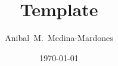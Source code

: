 \documentclass{amsart}
\title[Short title]{Template}
\author{Anibal~M.~Medina-Mardones}
\date{\today}
\begin{document}
	
	\maketitle
	
	
	
	\nocite{*}
	\sloppy
	\printbibliography
	\todos
\end{document}
